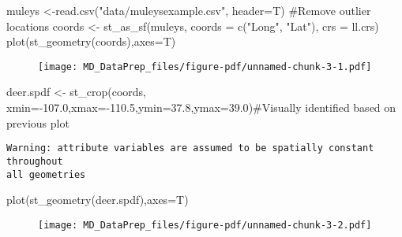 \documentclass[
  letterpaper,
]{book}
\newenvironment{Shaded}{\begin{snugshade}}{\end{snugshade}}
\newcommand{\AttributeTok}[1]{\textcolor[rgb]{0.40,0.45,0.13}{#1}}
\newcommand{\CommentTok}[1]{\textcolor[rgb]{0.37,0.37,0.37}{#1}}
\newcommand{\FloatTok}[1]{\textcolor[rgb]{0.68,0.00,0.00}{#1}}
\newcommand{\FunctionTok}[1]{\textcolor[rgb]{0.28,0.35,0.67}{#1}}
\newcommand{\NormalTok}[1]{\textcolor[rgb]{0.00,0.23,0.31}{#1}}
\newcommand{\OtherTok}[1]{\textcolor[rgb]{0.00,0.23,0.31}{#1}}
\newcommand{\SpecialCharTok}[1]{\textcolor[rgb]{0.37,0.37,0.37}{#1}}
\newcommand{\StringTok}[1]{\textcolor[rgb]{0.13,0.47,0.30}{#1}}
\begin{document}
\begin{Shaded}
\begin{Highlighting}[]
\NormalTok{muleys }\OtherTok{\textless{}{-}}\FunctionTok{read.csv}\NormalTok{(}\StringTok{"data/muleysexample.csv"}\NormalTok{, }\AttributeTok{header=}\NormalTok{T)}
\CommentTok{\#Remove outlier locations}
\NormalTok{coords }\OtherTok{\textless{}{-}} \FunctionTok{st\_as\_sf}\NormalTok{(muleys, }\AttributeTok{coords =} \FunctionTok{c}\NormalTok{(}\StringTok{"Long"}\NormalTok{, }\StringTok{"Lat"}\NormalTok{), }\AttributeTok{crs =}\NormalTok{ ll.crs)}
\FunctionTok{plot}\NormalTok{(}\FunctionTok{st\_geometry}\NormalTok{(coords),}\AttributeTok{axes=}\NormalTok{T)}
\end{Highlighting}
\end{Shaded}

\begin{figure}[H]

{\centering \texttt{[image: MD\_DataPrep\_files/figure-pdf/unnamed-chunk-3-1.pdf]}

}

\end{figure}

\begin{Shaded}
\begin{Highlighting}[]
\NormalTok{deer.spdf }\OtherTok{\textless{}{-}} \FunctionTok{st\_crop}\NormalTok{(coords, }\AttributeTok{xmin=}\SpecialCharTok{{-}}\FloatTok{107.0}\NormalTok{,}\AttributeTok{xmax=}\SpecialCharTok{{-}}\FloatTok{110.5}\NormalTok{,}\AttributeTok{ymin=}\FloatTok{37.8}\NormalTok{,}\AttributeTok{ymax=}\FloatTok{39.0}\NormalTok{)}\CommentTok{\#Visually identified based on previous plot}
\end{Highlighting}
\end{Shaded}

\begin{verbatim}
Warning: attribute variables are assumed to be spatially constant throughout
all geometries
\end{verbatim}

\begin{Shaded}
\begin{Highlighting}[]
\FunctionTok{plot}\NormalTok{(}\FunctionTok{st\_geometry}\NormalTok{(deer.spdf),}\AttributeTok{axes=}\NormalTok{T)}
\end{Highlighting}
\end{Shaded}

\begin{figure}[H]

{\centering \texttt{[image: MD\_DataPrep\_files/figure-pdf/unnamed-chunk-3-2.pdf]}

}

\end{figure}
\end{document}
